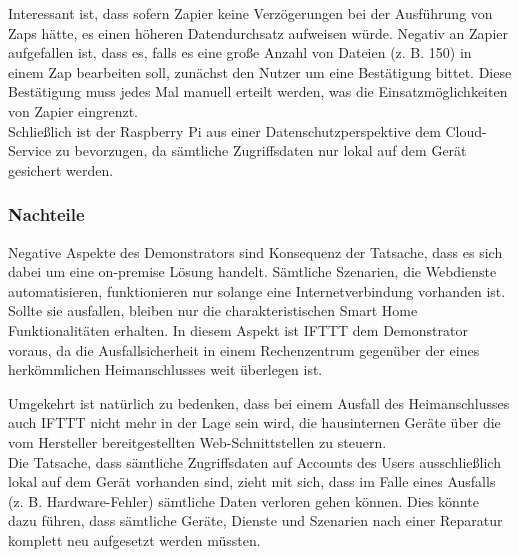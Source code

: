 Interessant ist, dass sofern Zapier keine Verzögerungen bei der Ausführung von Zaps hätte, es einen höheren Datendurchsatz aufweisen würde. Negativ an Zapier aufgefallen ist, dass es, falls es eine große Anzahl von Dateien (z. B. 150) in einem Zap bearbeiten soll, zunächst den Nutzer um eine Bestätigung bittet. Diese Bestätigung muss jedes Mal manuell erteilt werden, was die Einsatzmöglichkeiten von Zapier eingrenzt. \\


Schließlich ist der Raspberry Pi aus einer Datenschutzperspektive dem Cloud-Service zu bevorzugen, da sämtliche Zugriffsdaten nur lokal auf dem Gerät gesichert werden.

\subsubsection{Nachteile}
Negative Aspekte des Demonstrators sind Konsequenz der Tatsache, dass es sich dabei um eine on-premise Lösung handelt. Sämtliche Szenarien, die Webdienste automatisieren, funktionieren nur solange eine Internetverbindung  vorhanden ist. Sollte sie ausfallen, bleiben nur die charakteristischen Smart Home Funktionalitäten erhalten. In diesem Aspekt ist IFTTT dem Demonstrator voraus, da die Ausfallsicherheit in einem Rechenzentrum gegenüber der eines herkömmlichen Heimanschlusses weit überlegen ist.

Umgekehrt ist natürlich zu bedenken, dass bei einem Ausfall des Heimanschlusses auch IFTTT nicht mehr in der Lage sein wird, die hausinternen Geräte über die vom Hersteller bereitgestellten Web-Schnittstellen zu steuern. \\

Die Tatsache, dass sämtliche Zugriffsdaten auf Accounts des Users ausschließlich lokal auf dem Gerät vorhanden sind, zieht mit sich, dass im Falle eines Ausfalls (z. B. Hardware-Fehler) sämtliche Daten verloren gehen können. Dies könnte dazu führen, dass sämtliche Geräte, Dienste und Szenarien nach einer Reparatur komplett neu aufgesetzt werden müssten.



